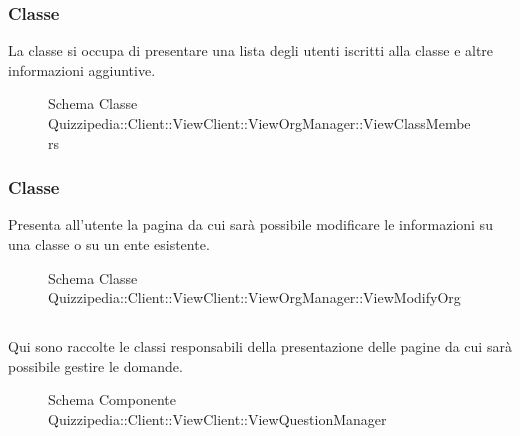 \subsubsection{Classe }
La classe si occupa di presentare una lista degli utenti iscritti alla classe e altre informazioni aggiuntive.
\begin{figure}[H]
\centering
\noindent{}
\caption[Schema Classe ViewClassMembers]{Schema Classe Quizzipedia::Client::ViewClient::ViewOrgManager::ViewClassMembers}
\end{figure}
\subsubsection{Classe }
Presenta all'utente la pagina da cui sarà possibile modificare le informazioni su una classe o su un ente esistente.
\begin{figure}[H]
\centering
\noindent{}
\caption[Schema Classe ViewModifyOrg]{Schema Classe Quizzipedia::Client::ViewClient::ViewOrgManager::ViewModifyOrg}
\end{figure}
\subsection{}
Qui sono raccolte le classi responsabili della presentazione delle pagine da cui sarà possibile gestire le domande.
\begin{figure}[H]
\centering
\noindent{}
\caption[Schema Componente Quizzipedia::Client::ViewClient::ViewQuestionManager]{Schema Componente Quizzipedia::Client::ViewClient::ViewQuestionManager}
\end{figure}
